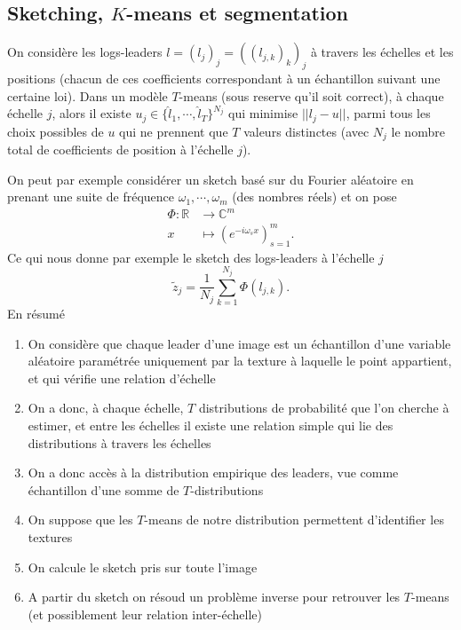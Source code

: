 \documentclass[11pt]{article} %
\begin{document}
\subsection{Sketching, $K$-means et segmentation}
\par
On considère les logs-leaders $l = (l_j)_j = ((l_{j,k})_k)_j$ à travers les échelles et les positions (chacun de ces coefficients correspondant à un échantillon suivant une certaine loi). Dans un modèle $T$-means (sous reserve qu'il soit correct), à chaque échelle $j$, alors il existe $u_j \in \{\hat{l}_1,\cdots,\hat{l}_T\}^{N_j}$ qui minimise $||l_j - u||$, parmi tous les choix possibles de $u$ qui ne prennent que $T$ valeurs distinctes (avec $N_j$ le nombre total de coefficients de position à l'échelle $j$).
\par 
On peut par exemple considérer un sketch basé sur du Fourier aléatoire en prenant une suite de fréquence $\omega_1,\cdots, \omega_m$ (des nombres réels) et on pose
\begin{align}
	\Phi : \mathbb{R} &\to \mathbb{C}^m \\
		 x &\mapsto (e^{-i\omega_s x})_{s=1}^m.
\end{align}
Ce qui nous donne par exemple le sketch des logs-leaders à l'échelle $j$
\begin{equation}
	\tilde z_j = \frac{1}{N_j}\sum_{k=1}^{N_j} \Phi(l_{j,k}).
\end{equation}
En résumé
\begin{enumerate}
	\item On considère que chaque leader d'une image est un échantillon d'une variable aléatoire paramétrée uniquement par la texture à laquelle le point appartient, et qui vérifie une relation d'échelle 
	\item On a donc, à chaque échelle, $T$ distributions de probabilité que l'on cherche à estimer, et entre les échelles il existe une relation simple qui lie des distributions à travers les échelles
	\item On a donc accès à la distribution empirique des leaders, vue comme échantillon d'une somme de $T$-distributions
	\item On suppose que les $T$-means de notre distribution permettent d'identifier les textures
	\item On calcule le sketch pris sur toute l'image
	\item A partir du sketch on résoud un problème inverse pour retrouver les $T$-means (et possiblement leur relation inter-échelle)
\end{enumerate}
\end{document}
